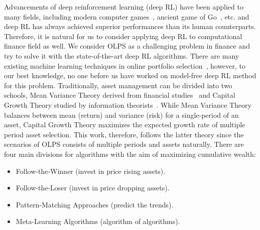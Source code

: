 Advancements of deep reinforcement learning (deep RL) have been applied to many fields, including modern computer games~\cite{mnih2015human}, ancient game of Go~\cite{silver2017mastering}, etc. and deep RL has always achieved superior performances than its human counterparts. Therefore, it is natural for us to consider applying deep RL to computational finance field as well. We consider OLPS as a challenging problem in finance and try to solve it with the state-of-the-art deep RL algorithms. There are many existing machine learning techniques in online portfolio selection~\cite{li2014online}, however, to our best knowledge, no one before us have worked on model-free deep RL method for this problem. Traditionally, asset management can be divided into two schools, Mean Variance Theory derived from financial studies~\cite{markowitz1952portfolio} and Capital Growth Theory studied by information theorists~\cite{kelly1956new, kelly2011new}. While Mean Variance Theory balances between mean (return) and variance (risk) for a single-period of an asset, Capital Growth Theory maximizes the expected growth rate of multiple period asset selection. This work, therefore, follows the latter theory since the scenarios of OLPS consists of multiple periods and assets naturally. There are four main divisions for algorithms with the aim of maximizing cumulative wealth:
\begin{itemize}
    \item Follow-the-Winner (invest in price rising assets).
    \item Follow-the-Loser (invest in price dropping assets).
    \item Pattern-Matching Approaches (predict the trends).
    \item Meta-Learning Algorithms (algorithm of algorithms).
\end{itemize}

